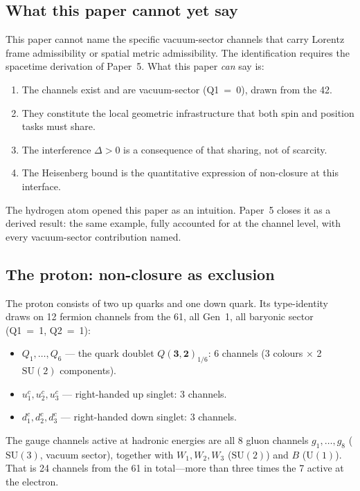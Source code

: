 \documentclass[11pt]{article}
\newenvironment{varlist}{\begin{itemize}[nosep,leftmargin=2em]}{\end{itemize}}
\newcommand{\SU}{\mathrm{SU}}
\newcommand{\U}{\mathrm{U}}
\begin{document}
\subsection*{What this paper cannot yet say}

This paper cannot name the specific vacuum-sector channels that carry
Lorentz frame admissibility or spatial metric admissibility.  The
identification requires the spacetime derivation of Paper~5.  What this
paper \emph{can} say is:

\begin{enumerate}
\item The channels exist and are vacuum-sector (Q1~=~0), drawn from the
42.
\item They constitute the local geometric infrastructure that both spin
and position tasks must share.
\item The interference $\Delta > 0$ is a consequence of that sharing,
not of scarcity.
\item The Heisenberg bound is the quantitative expression of
non-closure at this interface.
\end{enumerate}

The hydrogen atom opened this paper as an intuition.  Paper~5 closes it
as a derived result: the same example, fully accounted for at the channel
level, with every vacuum-sector contribution named.

\subsection*{The proton: non-closure as exclusion}

The proton consists of two up quarks and one down quark.  Its
type-identity draws on 12 fermion channels from the 61, all Gen~1, all
baryonic sector (Q1~=~1, Q2~=~1):

\begin{varlist}
\item $Q_1,\ldots,Q_6$ --- the quark doublet $Q(\mathbf{3},\mathbf{2})_{1/6}$: 6 channels
(3 colours $\times$ 2 $\SU(2)$ components).
\item $u^c_1, u^c_2, u^c_3$ --- right-handed up singlet: 3 channels.
\item $d^c_1, d^c_2, d^c_3$ --- right-handed down singlet: 3 channels.
\end{varlist}

The gauge channels active at hadronic energies are all 8 gluon channels
$g_1,\ldots,g_8$ ($\SU(3)$, vacuum sector), together with $W_1, W_2,
W_3$ ($\SU(2)$) and $B$ ($\U(1)$).  That is 24 channels from the 61 in
total---more than three times the 7 active at the electron.
\end{document}

